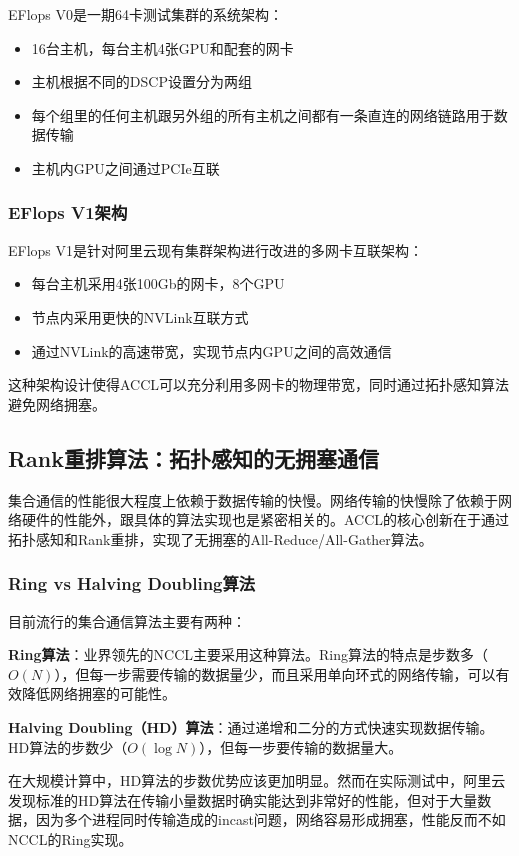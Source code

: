 EFlops V0是一期64卡测试集群的系统架构：
\begin{itemize}
    \item 16台主机，每台主机4张GPU和配套的网卡
    \item 主机根据不同的DSCP设置分为两组
    \item 每个组里的任何主机跟另外组的所有主机之间都有一条直连的网络链路用于数据传输
    \item 主机内GPU之间通过PCIe互联
\end{itemize}

\subsubsection{EFlops V1架构}

EFlops V1是针对阿里云现有集群架构进行改进的多网卡互联架构：
\begin{itemize}
    \item 每台主机采用4张100Gb的网卡，8个GPU
    \item 节点内采用更快的NVLink互联方式
    \item 通过NVLink的高速带宽，实现节点内GPU之间的高效通信
\end{itemize}

这种架构设计使得ACCL可以充分利用多网卡的物理带宽，同时通过拓扑感知算法避免网络拥塞。

\subsection{Rank重排算法：拓扑感知的无拥塞通信}

集合通信的性能很大程度上依赖于数据传输的快慢。网络传输的快慢除了依赖于网络硬件的性能外，跟具体的算法实现也是紧密相关的。ACCL的核心创新在于通过拓扑感知和Rank重排，实现了无拥塞的All-Reduce/All-Gather算法。

\subsubsection{Ring vs Halving Doubling算法}

目前流行的集合通信算法主要有两种：

\textbf{Ring算法}：业界领先的NCCL主要采用这种算法。Ring算法的特点是步数多（$O(N)$），但每一步需要传输的数据量少，而且采用单向环式的网络传输，可以有效降低网络拥塞的可能性。

\textbf{Halving Doubling（HD）算法}：通过递增和二分的方式快速实现数据传输。HD算法的步数少（$O(\log N)$），但每一步要传输的数据量大。

在大规模计算中，HD算法的步数优势应该更加明显。然而在实际测试中，阿里云发现标准的HD算法在传输小量数据时确实能达到非常好的性能，但对于大量数据，因为多个进程同时传输造成的incast问题，网络容易形成拥塞，性能反而不如NCCL的Ring实现。

